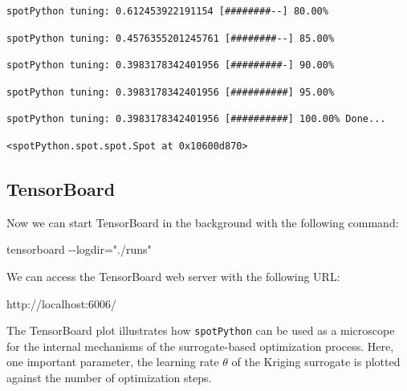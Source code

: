 \documentclass[
  letterpaper,
  DIV=11,
  numbers=noendperiod]{scrreprt}
\newenvironment{Shaded}{\begin{snugshade}}{\end{snugshade}}
\newcommand{\NormalTok}[1]{\textcolor[rgb]{0.00,0.23,0.31}{#1}}
\begin{document}
\begin{verbatim}
spotPython tuning: 0.612453922191154 [########--] 80.00% 
\end{verbatim}

\begin{verbatim}
spotPython tuning: 0.4576355201245761 [########--] 85.00% 
\end{verbatim}

\begin{verbatim}
spotPython tuning: 0.3983178342401956 [#########-] 90.00% 
\end{verbatim}

\begin{verbatim}
spotPython tuning: 0.3983178342401956 [##########] 95.00% 
\end{verbatim}

\begin{verbatim}
spotPython tuning: 0.3983178342401956 [##########] 100.00% Done...
\end{verbatim}

\begin{verbatim}
<spotPython.spot.spot.Spot at 0x10600d870>
\end{verbatim}

\hypertarget{tensorboard-7}{%
\subsection{TensorBoard}\label{tensorboard-7}}

Now we can start TensorBoard in the background with the following
command:

\begin{Shaded}
\begin{Highlighting}[]
\NormalTok{tensorboard {-}{-}logdir="./runs"}
\end{Highlighting}
\end{Shaded}

We can access the TensorBoard web server with the following URL:

\begin{Shaded}
\begin{Highlighting}[]
\NormalTok{http://localhost:6006/}
\end{Highlighting}
\end{Shaded}

The TensorBoard plot illustrates how \texttt{spotPython} can be used as
a microscope for the internal mechanisms of the surrogate-based
optimization process. Here, one important parameter, the learning rate
\(\theta\) of the Kriging surrogate is plotted against the number of
optimization steps.
\end{document}

